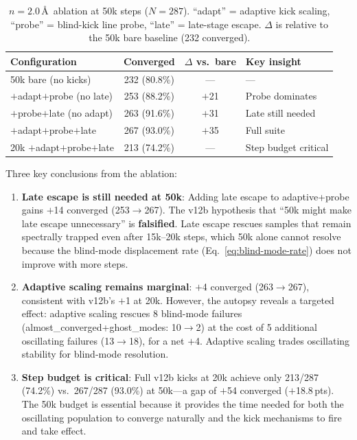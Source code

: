 \documentclass[11pt,a4paper]{article}
\theoremstyle{definition}
\begin{document}
\begin{table}[h]
\centering
\caption{$n=2.0$\,\AA\ ablation at 50k steps ($N=287$).
  ``adapt'' = adaptive kick scaling, ``probe'' = blind-kick line probe,
  ``late'' = late-stage escape.  $\Delta$ is relative to the 50k bare
  baseline (232 converged).}
\label{tab:v13-ablation}
\begin{tabular}{lccl}
\toprule
Configuration & Converged & $\Delta$ vs.\ bare & Key insight \\
\midrule
50k bare (no kicks)          & 232 (80.8\%) & --- & --- \\
$+$adapt$+$probe (no late)   & 253 (88.2\%) & $+$21 & Probe dominates \\
$+$probe$+$late (no adapt)   & 263 (91.6\%) & $+$31 & Late still needed \\
$+$adapt$+$probe$+$late      & 267 (93.0\%) & $+$35 & Full suite \\
\midrule
20k $+$adapt$+$probe$+$late  & 213 (74.2\%) & --- & Step budget critical \\
\bottomrule
\end{tabular}
\end{table}

Three key conclusions from the ablation:

\begin{enumerate}[nosep]
  \item \textbf{Late escape is still needed at 50k}: Adding late escape
    to adaptive+probe gains $+$14 converged (253$\to$267).  The v12b
    hypothesis that ``50k might make late escape unnecessary'' is
    \textbf{falsified}.  Late escape rescues samples that remain
    spectrally trapped even after 15k--20k steps, which 50k alone cannot
    resolve because the blind-mode displacement rate
    (Eq.~\ref{eq:blind-mode-rate}) does not improve with more steps.
  \item \textbf{Adaptive scaling remains marginal}: $+$4 converged
    (263$\to$267), consistent with v12b's $+$1 at 20k.  However, the
    autopsy reveals a targeted effect: adaptive scaling rescues 8
    blind-mode failures (almost\_converged+ghost\_modes: 10$\to$2) at the
    cost of 5 additional oscillating failures (13$\to$18), for a net
    $+$4.  Adaptive scaling trades oscillating stability for blind-mode
    resolution.
  \item \textbf{Step budget is critical}: Full v12b kicks at 20k achieve
    only 213/287 (74.2\%) vs.\ 267/287 (93.0\%) at 50k---a gap of $+$54
    converged ($+$18.8\,pts).  The 50k budget is essential because it
    provides the time needed for both the oscillating population to
    converge naturally and the kick mechanisms to fire and take effect.
\end{enumerate}
\end{document}
